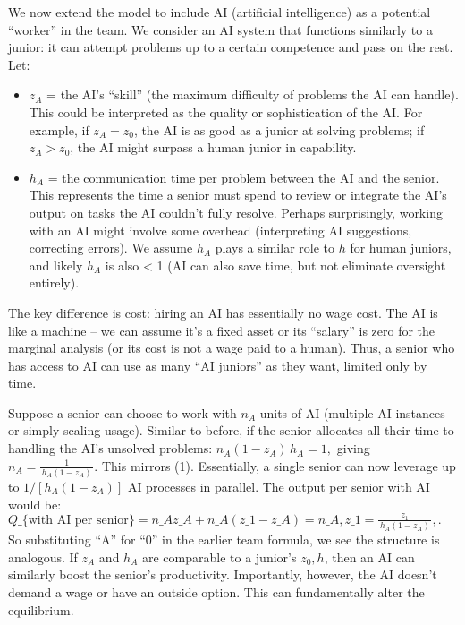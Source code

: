 \documentclass[12pt]{article}
\begin{document}
We now extend the model to include {AI (artificial intelligence)}
as a potential ``worker'' in the team. We consider an AI system that
functions similarly to a junior: it can attempt problems up to a certain
competence and pass on the rest. Let:

\begin{itemize}

\item
  \(z_A\) = the AI's ``skill'' (the maximum difficulty of problems the
  AI can handle). This could be interpreted as the quality or
  sophistication of the AI. For example, if \(z_A = z_0\), the AI is as
  good as a junior at solving problems; if \(z_A > z_0\), the AI might
  surpass a human junior in capability.
\item
  \(h_A\) = the communication time per problem between the AI and the
  senior. This represents the {time a senior must spend to review
  or integrate the AI's output on tasks the AI couldn't fully resolve}.
  Perhaps surprisingly, working with an AI might involve some overhead
  (interpreting AI suggestions, correcting errors). We assume \(h_A\)
  plays a similar role to \(h\) for human juniors, and likely \(h_A\) is
  also \textless{} 1 (AI can also save time, but not eliminate oversight
  entirely).
\end{itemize}

The key difference is {cost:} hiring an AI has essentially
{no wage cost}. The AI is like a machine -- we can assume it's a
fixed asset or its ``salary'' is zero for the marginal analysis (or its
cost is not a wage paid to a human). Thus, a senior who has access to AI
can use as many ``AI juniors'' as they want, limited only by time.

Suppose a senior can choose to work with {\(n_A\) units of AI}
(multiple AI instances or simply scaling usage). Similar to before, if
the senior allocates all their time to handling the AI's unsolved
problems: \(n_A (1 - z_A)\, h_A = 1,\) giving
\(n_A = \frac{1}{\,h_A(1-z_A)\,}.\) This mirrors (1). Essentially, a
single senior can now leverage up to \(1/[h_A(1-z_A)]\) AI processes in
parallel. The {output per senior with AI} would be: $
Q\_\{\text{with AI per senior}\} = n\_A z\_A + n\_A (z\_1 - z\_A) =
n\_A, z\_1 = \frac{z_1}{\,h_A(1-z_A)\,},. \tag{7}$ So substituting
``A'' for ``0'' in the earlier team formula, we see the structure is
analogous. If \(z_A\) and \(h_A\) are comparable to a junior's
\(z_0, h\), then an AI can similarly boost the senior's productivity.
{Importantly, however, the AI doesn't demand a wage or have an
outside option.} This can fundamentally alter the equilibrium.
\end{document}
